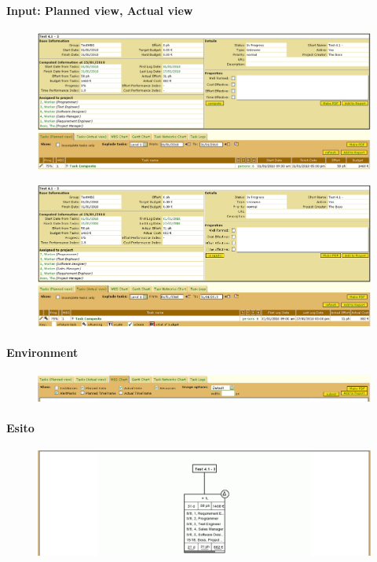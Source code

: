 \paragraph{Input: Planned view, Actual view}
\begin{figure}[h!]
\centering
\includegraphics[width=\textwidth]{tests/TEST_WBS/4.1/4.1_3/Esempio_1/input.png}
\end{figure}
\begin{figure}[h!]
\centering
\includegraphics[width=\textwidth]{tests/TEST_WBS/4.1/4.1_3/Esempio_1/input_actual.png}
\end{figure}
\newpage

\paragraph{Environment}
\begin{figure}
\centering
\includegraphics[width=\textwidth]{tests/TEST_WBS/4.1/4.1_3/Esempio_1/environment.png}
\end{figure}

\paragraph{Esito}
\begin{figure}
\centering
\includegraphics[width=\textwidth]{tests/TEST_WBS/4.1/4.1_3/Esempio_1/output.png}
\end{figure}
\newpage

